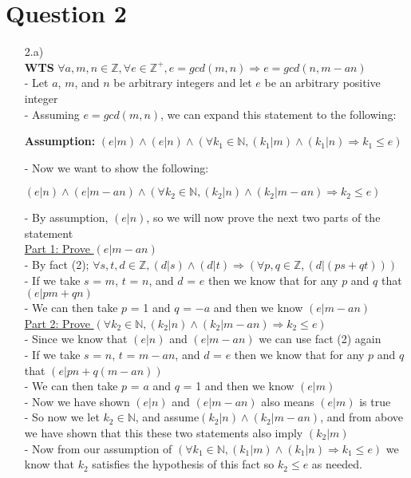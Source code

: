 \documentclass[20pt]{article}
\begin{document}
\newpage

\section*{Question 2}

\begin{enumerate}
\item[2.a)] \\
\textbf{WTS} $\forall a,m,n \in\mathbb{Z},\forall e \in\mathbb{Z}^+, e = gcd(m, n) \Rightarrow e = gcd(n,m-an)$ \\
- Let $a$, $m$, and $n$ be arbitrary integers and let $e$ be an arbitrary positive integer\\
- Assuming $e = gcd(m, n)$, we can expand this statement to the following:\\
\begin{center}
\textbf{Assumption:} $(e|m)\land(e|n)\land(\forall k_1 \in\mathbb{N}, (k_1|m)\land(k_1|n)\Rightarrow k_1 \leq e)$\\
\end{center}
- Now we want to show the following: 
\begin{center}
$(e|n)\land(e|m-an)\land(\forall k_2 \in\mathbb{N}, (k_2|n)\land(k_2|m-an)\Rightarrow k_2 \leq e)$\\
\end{center}
- By assumption, $(e|n)$, so we will now prove the next two parts of the statement\\

\underline{Part 1: Prove $(e|m-an)$}\\
- By fact (2); $\forall s,t,d\in\mathbb{Z},(d|s)\land (d|t) \Rightarrow (\forall p,q\in\mathbb{Z}, (d|(ps+qt)))$\\
- If we take $s$ = $m$, $t$ = $n$, and $d$ = $e$ then we know that for any $p$ and $q$ that $(e|pm+qn)$\\
- We can then take $p$ = 1 and $q$ = $-a$ and then we know $(e|m-an)$\\

\underline{Part 2: Prove $(\forall k_2 \in\mathbb{N}, (k_2|n)\land(k_2|m-an)\Rightarrow k_2 \leq e)$}\\
- Since we know that $(e|n)$ and $(e|m-an)$ we can use fact (2) again \\
- If we take $s$ = $n$, $t$ = $m-an$, and $d$ = $e$ then we know that for any $p$ and $q$ that $(e|pn+q(m-an))$\\
- We can then take $p$ = $a$ and $q$ = 1 and then we know $(e|m)$\\
- Now we have shown $(e|n)$ and $(e|m-an)$ also means $(e|m)$ is true \\
- So now we let $k_2 \in \mathbb{N}$, and assume$(k_2|n)\land(k_2|m-an)$, and from above we have shown that this these two statements also imply $(k_2|m)$ \\
- Now from our assumption of $(\forall k_1 \in\mathbb{N}, (k_1|m)\land(k_1|n)\Rightarrow k_1 \leq e)$ we know that $k_2$ satisfies the hypothesis of this fact so $k_2 \leq e$ as needed.\\


\end{enumerate}
\end{document}
